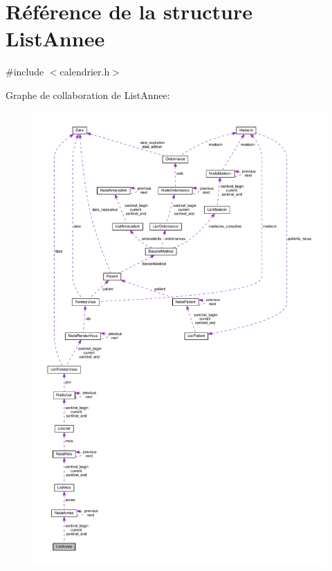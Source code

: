 \hypertarget{struct_list_annee}{\section{Référence de la structure List\-Annee}
\label{struct_list_annee}
}


{\ttfamily \#include $<$calendrier.\-h$>$}



Graphe de collaboration de List\-Annee\-:
\nopagebreak
\begin{figure}[H]
\begin{center}
\leavevmode
\includegraphics[width=350pt]{struct_list_annee__coll__graph}
\end{center}
\end{figure}
